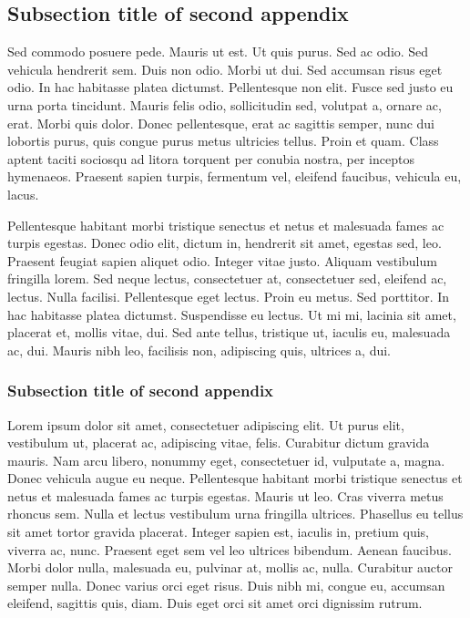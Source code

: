 \documentclass[AMA,STIX1COL]{WileyNJD-SP}
\begin{document}
\subsection{Subsection title of second appendix\label{app2.1a}}

Sed commodo posuere pede. Mauris ut est. Ut quis purus. Sed ac odio. Sed vehicula hendrerit sem. Duis non odio.
Morbi ut dui. Sed accumsan risus eget odio. In hac habitasse platea dictumst. Pellentesque non elit. Fusce sed justo
eu urna porta tincidunt. Mauris felis odio, sollicitudin sed, volutpat a, ornare ac, erat. Morbi quis dolor. Donec
pellentesque, erat ac sagittis semper, nunc dui lobortis purus, quis congue purus metus ultricies tellus. Proin et quam.
Class aptent taciti sociosqu ad litora torquent per conubia nostra, per inceptos hymenaeos. Praesent sapien turpis,
fermentum vel, eleifend faucibus, vehicula eu, lacus.

Pellentesque habitant morbi tristique senectus et netus et malesuada fames ac turpis egestas. Donec odio elit,
dictum in, hendrerit sit amet, egestas sed, leo. Praesent feugiat sapien aliquet odio. Integer vitae justo. Aliquam
vestibulum fringilla lorem. Sed neque lectus, consectetuer at, consectetuer sed, eleifend ac, lectus. Nulla facilisi.
Pellentesque eget lectus. Proin eu metus. Sed porttitor. In hac habitasse platea dictumst. Suspendisse eu lectus. Ut
mi mi, lacinia sit amet, placerat et, mollis vitae, dui. Sed ante tellus, tristique ut, iaculis eu, malesuada ac, dui.
Mauris nibh leo, facilisis non, adipiscing quis, ultrices a, dui.

\subsubsection{Subsection title of second appendix\label{app2.1.1a}}

Lorem ipsum dolor sit amet, consectetuer adipiscing elit. Ut purus elit, vestibulum ut, placerat ac, adipiscing vitae,
felis. Curabitur dictum gravida mauris. Nam arcu libero, nonummy eget, consectetuer id, vulputate a, magna. Donec
vehicula augue eu neque. Pellentesque habitant morbi tristique senectus et netus et malesuada fames ac turpis egestas.
Mauris ut leo. Cras viverra metus rhoncus sem. Nulla et lectus vestibulum urna fringilla ultrices. Phasellus eu tellus
sit amet tortor gravida placerat. Integer sapien est, iaculis in, pretium quis, viverra ac, nunc. Praesent eget sem vel
leo ultrices bibendum. Aenean faucibus. Morbi dolor nulla, malesuada eu, pulvinar at, mollis ac, nulla. Curabitur
auctor semper nulla. Donec varius orci eget risus. Duis nibh mi, congue eu, accumsan eleifend, sagittis quis, diam.
Duis eget orci sit amet orci dignissim rutrum.
\end{document}

